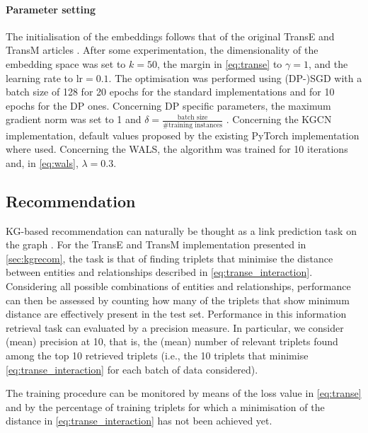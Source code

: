 \paragraph{Parameter setting} The initialisation of the embeddings follows that of the original TransE and TransM articles \parencite{bordes2013translating, fan2014transition}.
After some experimentation, the dimensionality of the embedding space was set to $k=50$, the margin in \cref{eq:transe} to $\gamma =1$, and the learning rate to $\text{lr} = 0.1$.
The optimisation was performed using (DP-)SGD with a batch size of \num{128} for \num{20} epochs for the standard implementations and for \num{10} epochs for the DP ones.
Concerning DP specific parameters, the maximum gradient norm was set to \num{1} and $\delta = \frac{\text{batch size}}{\text{\# training instances}}$ \parencite{lee2011much}.
Concerning the KGCN implementation, default values proposed by the existing PyTorch implementation where used.
Concerning the WALS, the algorithm was trained for 10 iterations and, in \cref{eq:wals}, $\lambda = 0.3$.



\subsection{Recommendation}

KG-based recommendation can naturally be thought as a link prediction task on the graph \parencite{guo2020survey}.
For the TransE and TransM implementation presented in \cref{sec:kgrecom}, the task is that of finding triplets that minimise the distance between entities and relationships described in \cref{eq:transe_interaction}.
Considering all possible combinations of entities and relationships, performance can then be assessed by counting how many of the triplets that show minimum distance are effectively present in the test set. 
Performance in this information retrieval task can evaluated by a precision measure.
In particular, we consider (mean) precision at 10, that is, the (mean) number of relevant triplets found among the top 10 retrieved triplets (i.e., the 10 triplets that minimise \cref{eq:transe_interaction} for each batch of data considered).

The training procedure can be monitored by means of the loss value in \cref{eq:transe} and by the percentage of training triplets for which a minimisation of the distance in \cref{eq:transe_interaction} has not been achieved yet.

